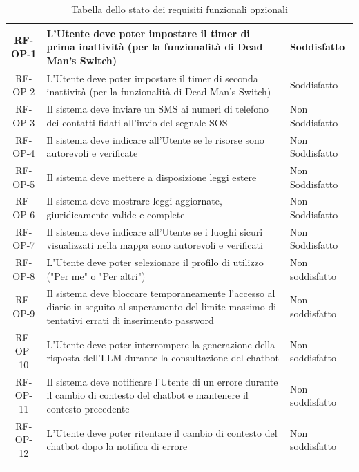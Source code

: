 \documentclass[a4paper,12pt]{article}
\begin{document}
\begin{center}
\begin{longtable}{|c|p{8.5cm}|>{\centering\arraybackslash}p{4cm}|}
\rowcolor{gray!20}
RF-OP-1 & L'Utente deve poter impostare il timer di prima inattività (per la funzionalità di Dead Man's Switch) & Soddisfatto \\
\hline
\rowcolor{white}
RF-OP-2 & L'Utente deve poter impostare il timer di seconda inattività (per la funzionalità di Dead Man's Switch) & Soddisfatto \\
\hline
\rowcolor{gray!20}
RF-OP-3 & Il sistema deve inviare un SMS ai numeri di telefono dei contatti fidati all'invio del segnale SOS & Non Soddisfatto \\
\hline
\rowcolor{white}
RF-OP-4 & Il sistema deve indicare all'Utente se le risorse sono autorevoli e verificate & Non Soddisfatto \\
\hline
\rowcolor{gray!20}
RF-OP-5 & Il sistema deve mettere a disposizione leggi estere & Non Soddisfatto \\
\hline
\rowcolor{white}
RF-OP-6 & Il sistema deve mostrare leggi aggiornate, giuridicamente valide e complete & Non Soddisfatto \\
\hline
\rowcolor{gray!20}
RF-OP-7 & Il sistema deve indicare all'Utente se i luoghi sicuri visualizzati nella mappa sono autorevoli e verificati & Non Soddisfatto \\
\hline
\rowcolor{white}
RF-OP-8 & L'Utente deve poter selezionare il profilo di utilizzo ("Per me" o "Per altri") & Non soddisfatto \\
\hline
\rowcolor{gray!20}
RF-OP-9 & Il sistema deve bloccare temporaneamente l'accesso al diario in seguito al superamento del limite massimo di tentativi errati di inserimento password & Non soddisfatto \\
\hline
\rowcolor{white}
RF-OP-10 & L'Utente deve poter interrompere la generazione della risposta dell'LLM durante la consultazione del chatbot & Non soddisfatto \\
\hline
\rowcolor{gray!20}
RF-OP-11 & Il sistema deve notificare l'Utente di un errore durante il cambio di contesto del chatbot e mantenere il contesto precedente & Non soddisfatto \\
\hline
\rowcolor{white}
RF-OP-12 & L'Utente deve poter ritentare il cambio di contesto del chatbot dopo la notifica di errore & Non soddisfatto \\
\hline

\caption{Tabella dello stato dei requisiti funzionali opzionali} \label{tab:stato_requisiti_funzionali_opzionali} \\
\end{longtable}
\end{center}
\end{document}
